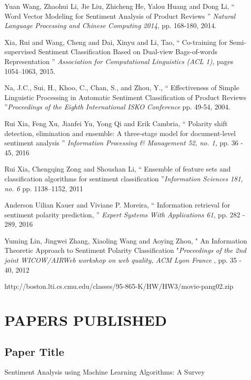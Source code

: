 \documentclass[oneside,a4paper,12pt]{pictreport}
\begin{document}
\begin{thebibliography}{20}
  Yuan Wang, Zhaohui Li, Jie Liu, Zhicheng He, Yalou Huang and Dong Li,
 `` Word Vector Modeling for Sentiment Analysis
of Product Reviews '' {\em Natural Language Processing and Chinese Computing 2014,} pp. 168-180, 2014.


Xia, Rui and Wang, Cheng and Dai, Xinyu and Li, Tao, 
`` Co-training for Semi-supervised Sentiment Classification Based on Dual-view Bags-of-words Representation ''
  {\em Association for Computational Linguistics (ACL 1),} pages 1054–1063, 2015.
  
Na, J.C., Sui, H., Khoo, C., Chan, S., and Zhou, Y., `` Effectiveness of Simple Linguistic Processing in Automatic 
Sentiment Classification of Product Reviews ''{\em Proceedings 
of the Eighth International ISKO Conference
 } pp. 49-54, 2004.
 
 Rui Xia, Feng Xu, Jianfei Yu, Yong Qi and Erik Cambria, `` Polarity shift detection, elimination and ensemble:
A three-stage model for document-level sentiment analysis '' {\em  Information Processing \& Management 52, no. 1, } pp. 36 - 45, 2016

Rui Xia, Chengqing Zong and Shoushan Li, `` Ensemble of feature sets and classification algorithms
for sentiment classification ''{\em  Information Sciences 181, no. 6 } pp. 1138–1152, 2011

Anderson Uilian Kauer and Viviane P. Moreira, `` Information retrieval for sentiment polarity prediction, ''
{\em Expert Systems With Applications 61,} pp. 282 - 289, 2016

Yuming Lin, Jingwei Zhang, Xiaoling Wang and Aoying Zhou, " An Information Theoretic Approach to Sentiment Polarity
Classification "{\em Proceedings of the 2nd joint WICOW/AIRWeb workshop on web quality, ACM Lyon France }, pp. 35 - 40, 2012

http://boston.lti.cs.cmu.edu/classes/95-865-K/HW/HW3/movie-pang02.zip
\end{thebibliography}

\appendix
\chapter{PAPERS PUBLISHED}
\section{Paper Title}
Sentiment Analysis using Machine Learning Algorithms: A Survey
\end{document}
